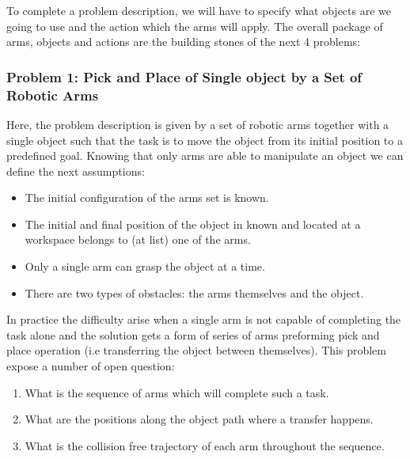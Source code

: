 To complete a problem description, we will have to specify what objects are we going to use and the action which the arms will apply. The overall package of arms, objects and actions are the building stones of the next 4 problems:

\subsubsection*{Problem 1: Pick and Place of Single object by a Set of Robotic Arms}
 
Here, the problem description is given by a set of robotic arms together with a single object such that the task is to move the object from its initial position to a predefined goal. Knowing that only arms are able to manipulate an object we can define the next assumptions:
\begin{itemize}
\item The initial configuration of the arms set is known.
\item The initial and final position of the object in known and located at a workspace belongs to (at list) one of the arms.
\item Only a single arm can grasp the object at a time. 
\item There are two types of obstacles: the arms themselves and the object.
\end{itemize}
In practice the difficulty arise when a single arm is not capable of completing the task alone and the solution gets a form of series of arms preforming pick and place operation (i.e transferring the object between themselves). This problem expose a number of open question:
\begin{enumerate}
\item What is the sequence of arms which will complete such a task.
\item What are the positions along the object path where a transfer happens.
\item What is the collision free trajectory of each arm throughout the sequence.
\end{enumerate}


